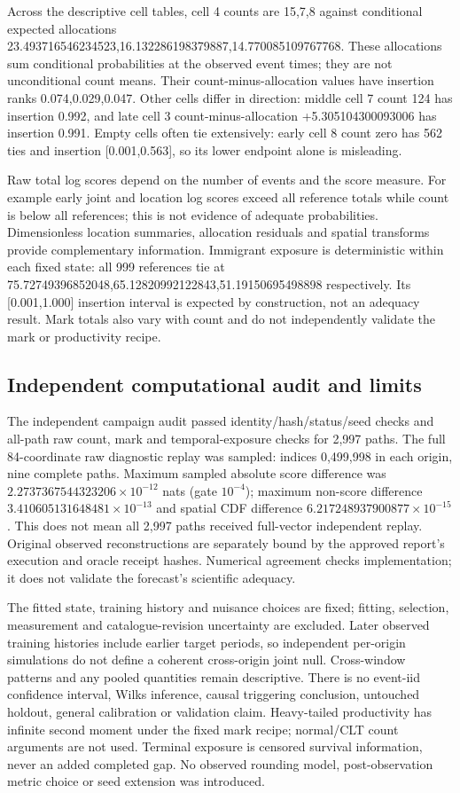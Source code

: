 Across the descriptive cell tables, cell 4 counts are 15,7,8 against conditional expected allocations 23.493716546234523,16.132286198379887,14.770085109767768. These allocations sum conditional probabilities at the observed event times; they are not unconditional count means. Their count-minus-allocation values have insertion ranks 0.074,0.029,0.047. Other cells differ in direction: middle cell 7 count 124 has insertion 0.992, and late cell 3 count-minus-allocation +5.305104300093006 has insertion 0.991. Empty cells often tie extensively: early cell 8 count zero has 562 ties and insertion [0.001,0.563], so its lower endpoint alone is misleading.

Raw total log scores depend on the number of events and the score measure. For example early joint and location log scores exceed all reference totals while count is below all references; this is not evidence of adequate probabilities. Dimensionless location summaries, allocation residuals and spatial transforms provide complementary information. Immigrant exposure is deterministic within each fixed state: all 999 references tie at 75.72749396852048,65.12820992122843,51.19150695498898 respectively. Its [0.001,1.000] insertion interval is expected by construction, not an adequacy result. Mark totals also vary with count and do not independently validate the mark or productivity recipe.

\subsection{Independent computational audit and limits}

The independent campaign audit passed identity/hash/status/seed checks and all-path raw count, mark and temporal-exposure checks for 2,997 paths. The full 84-coordinate raw diagnostic replay was sampled: indices 0,499,998 in each origin, nine complete paths. Maximum sampled absolute score difference was $2.2737367544323206\times 10^{-12}$ nats (gate $10^{-4}$); maximum non-score difference $3.410605131648481\times 10^{-13}$ and spatial CDF difference $6.217248937900877\times 10^{-15}$. This does not mean all 2,997 paths received full-vector independent replay. Original observed reconstructions are separately bound by the approved report's execution and oracle receipt hashes. Numerical agreement checks implementation; it does not validate the forecast's scientific adequacy.

The fitted state, training history and nuisance choices are fixed; fitting, selection, measurement and catalogue-revision uncertainty are excluded. Later observed training histories include earlier target periods, so independent per-origin simulations do not define a coherent cross-origin joint null. Cross-window patterns and any pooled quantities remain descriptive. There is no event-iid confidence interval, Wilks inference, causal triggering conclusion, untouched holdout, general calibration or validation claim. Heavy-tailed productivity has infinite second moment under the fixed mark recipe; normal/CLT count arguments are not used. Terminal exposure is censored survival information, never an added completed gap. No observed rounding model, post-observation metric choice or seed extension was introduced.

